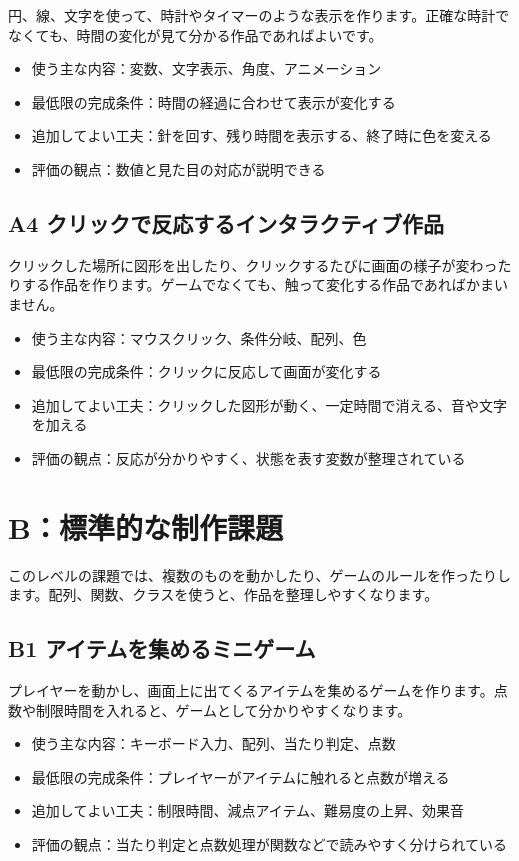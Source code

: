 円、線、文字を使って、時計やタイマーのような表示を作ります。正確な時計でなくても、時間の変化が見て分かる作品であればよいです。

\begin{itemize}
    \item 使う主な内容：変数、文字表示、角度、アニメーション
    \item 最低限の完成条件：時間の経過に合わせて表示が変化する
    \item 追加してよい工夫：針を回す、残り時間を表示する、終了時に色を変える
    \item 評価の観点：数値と見た目の対応が説明できる
\end{itemize}

\subsection{A4 クリックで反応するインタラクティブ作品}

クリックした場所に図形を出したり、クリックするたびに画面の様子が変わったりする作品を作ります。ゲームでなくても、触って変化する作品であればかまいません。

\begin{itemize}
    \item 使う主な内容：マウスクリック、条件分岐、配列、色
    \item 最低限の完成条件：クリックに反応して画面が変化する
    \item 追加してよい工夫：クリックした図形が動く、一定時間で消える、音や文字を加える
    \item 評価の観点：反応が分かりやすく、状態を表す変数が整理されている
\end{itemize}

\section{B：標準的な制作課題}

このレベルの課題では、複数のものを動かしたり、ゲームのルールを作ったりします。配列、関数、クラスを使うと、作品を整理しやすくなります。

\subsection{B1 アイテムを集めるミニゲーム}

プレイヤーを動かし、画面上に出てくるアイテムを集めるゲームを作ります。点数や制限時間を入れると、ゲームとして分かりやすくなります。

\begin{itemize}
    \item 使う主な内容：キーボード入力、配列、当たり判定、点数
    \item 最低限の完成条件：プレイヤーがアイテムに触れると点数が増える
    \item 追加してよい工夫：制限時間、減点アイテム、難易度の上昇、効果音
    \item 評価の観点：当たり判定と点数処理が関数などで読みやすく分けられている
\end{itemize}

